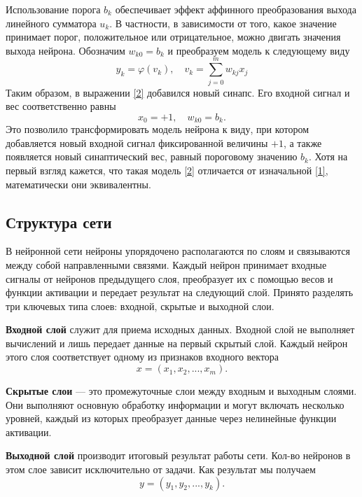 \documentclass[12pt, a4paper]{article}
\renewcommand{\phi}{\varphi}
\begin{document}
Использование порога $b_k$ обеспечивает эффект аффинного преобразования выхода линейного сумматора $u_k$. В частности, в зависимости от того, какое значение принимает порог,  положительное или отрицательное, можно двигать значения выхода нейрона. Обозначим $w_{k0} = b_k$ и преобразуем модель к следующему виду
\begin{equation}
	y_k = \phi(v_k), \quad v_k = \sum_{j = 0}^{m} w_{kj}x_j 
	\label{2}
\end{equation}
 Таким образом, в выражении \eqref{2} добавился новый синапс. Его входной сигнал и вес соответственно равны
 \begin{equation*}
 	x_0 = +1, \quad w_{k0} = b_k.
 \end{equation*}
 Это позволило трансформировать модель нейрона к виду, при котором добавляется новый входной сигнал фиксированной величины $+1$, а также появляется новый синаптический вес, равный пороговому значению $b_k$. Хотя на первый взгляд кажется, что такая модель \eqref{2} отличается от изначальной \eqref{1}, математически они эквивалентны.
  
  
  
\subsection{Структура сети}

В нейронной сети нейроны упорядочено располагаются по слоям и связываются между собой  направленными связями. Каждый нейрон принимает входные сигналы от нейронов предыдущего слоя, преобразует их с помощью весов и функции активации и передает результат на следующий слой.  Принято разделять три ключевых типа слоев: входной, скрытые и выходной слои.

\textbf{Входной слой} служит для приема исходных данных.  Входной слой не выполняет вычислений и лишь передает данные на первый скрытый слой. Каждый нейрон этого слоя соответствует одному из признаков входного вектора
  \begin{equation}
 	 x = (x_1, x_2, ..., x_m).
 	 \label{3}
 \end{equation}

\textbf{Скрытые слои} --- это промежуточные слои между входным и выходным слоями. Они выполняют основную обработку информации и могут включать несколько уровней, каждый из которых преобразует данные через нелинейные функции активации.

\textbf{Выходной слой} производит итоговый результат работы сети. Кол-во нейронов в этом слое зависит исключительно от задачи. Как результат мы получаем 
  \begin{equation}
	y = (y_1, y_2, ..., y_k).
	\label{4}
\end{equation}
\end{document}
